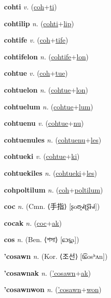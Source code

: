 \textbf{\hypertarget{cohti}{cohti}} \textit{v.} (\hyperlink{coh}{coh}+\allowbreak \hyperlink{ti}{ti})


\textbf{\hypertarget{cohtilip}{cohtilip}} \textit{n.} (\hyperlink{cohti}{cohti}+\allowbreak \hyperlink{lip}{lip})


\textbf{\hypertarget{cohtife}{cohtife}} \textit{v.} (\hyperlink{coh}{coh}+\allowbreak \hyperlink{tife}{tife})


\textbf{\hypertarget{cohtifelon}{cohtifelon}} \textit{n.} (\hyperlink{cohtife}{cohtife}+\allowbreak \hyperlink{lon}{lon})


\textbf{\hypertarget{cohtue}{cohtue}} \textit{v.} (\hyperlink{coh}{coh}+\allowbreak \hyperlink{tue}{tue})


\textbf{\hypertarget{cohtuelon}{cohtuelon}} \textit{n.} (\hyperlink{cohtue}{cohtue}+\allowbreak \hyperlink{lon}{lon})


\textbf{\hypertarget{cohtuelum}{cohtuelum}} \textit{n.} (\hyperlink{cohtue}{cohtue}+\allowbreak \hyperlink{lum}{lum})


\textbf{\hypertarget{cohtuenu}{cohtuenu}} \textit{v.} (\hyperlink{cohtue}{cohtue}+\allowbreak \hyperlink{nu}{nu})


\textbf{\hypertarget{cohtuenules}{cohtuenules}} \textit{n.} (\hyperlink{cohtuenu}{cohtuenu}+\allowbreak \hyperlink{les}{les})


\textbf{\hypertarget{cohtueki}{cohtueki}} \textit{v.} (\hyperlink{cohtue}{cohtue}+\allowbreak \hyperlink{ki}{ki})


\textbf{\hypertarget{cohtuekiles}{cohtuekiles}} \textit{n.} (\hyperlink{cohtueki}{cohtueki}+\allowbreak \hyperlink{les}{les})


\textbf{\hypertarget{cohpoltilum}{cohpoltilum}} \textit{n.} (\hyperlink{coh}{coh}+\allowbreak \hyperlink{poltilum}{poltilum})


\textbf{\hypertarget{coc}{coc}} \textit{n.} (Cmn. ⟨{\chinese{}手指}⟩ [ʂoʊ̯˧˩˧ʈ͡ʂɨ˧˩˧])


\textbf{\hypertarget{cocak}{cocak}} \textit{n.} (\hyperlink{coc}{coc}+\allowbreak \hyperlink{ak}{ak})


\textbf{\hypertarget{cos}{cos}} \textit{n.} (Ben. ⟨{\bengali{}শসা}⟩ [ɕɔs̪a])


\textbf{\hypertarget{'cosawn}{'cosawn}} \textit{n.} (Kor. ⟨{\korean{}조선}⟩ [t͡ɕosʰʌn])


\textbf{\hypertarget{'cosawnak}{'cosawnak}} \textit{n.} (\hyperlink{'cosawn}{'cosawn}+\allowbreak \hyperlink{ak}{ak})


\textbf{\hypertarget{'cosawnwon}{'cosawnwon}} \textit{n.} (\hyperlink{'cosawn}{'cosawn}+\allowbreak \hyperlink{won}{won})


